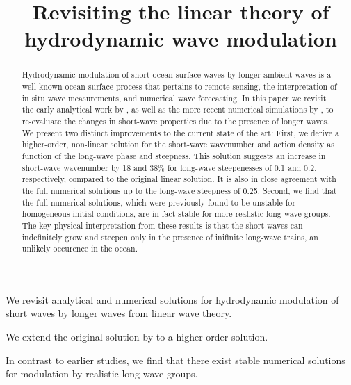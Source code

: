 \documentclass[draft]{agujournal2019}
\begin{document}
\title{Revisiting the linear theory of hydrodynamic wave modulation}




\begin{keypoints}
\item We revisit analytical and numerical solutions for hydrodynamic modulation of short waves by longer waves from linear wave theory.
\item We extend the original solution by  to a higher-order solution.
\item In contrast to earlier studies, we find that there exist stable numerical solutions for modulation by realistic long-wave groups.
\end{keypoints}

\begin{abstract}
Hydrodynamic modulation of short ocean surface waves by longer ambient waves is
a well-known ocean surface process that pertains to remote sensing, the
interpretation of in situ wave measurements, and numerical wave forecasting.
In this paper we revisit the early analytical work by ,
as well as the more recent numerical simulations by ,
to re-evaluate the changes in short-wave properties due to the presence of longer waves.
We present two distinct improvements to the current state of the art:
First, we derive a higher-order, non-linear solution for the short-wave wavenumber
and action density as function of the long-wave phase and steepness.
This solution suggests an increase in short-wave wavenumber by 18 and 38\% for
long-wave steepenesses of 0.1 and 0.2, respectively, compared to the original
linear solution.
It is also in close agreement with the full numerical solutions up to the
long-wave steepness of 0.25.
Second, we find that the full numerical solutions, which were previously found
to be unstable for homogeneous initial conditions, are in fact stable for more
realistic long-wave groups.
The key physical interpretation from these results is that the short waves can
indefinitely grow and steepen only in the presence of inifinite long-wave trains,
an unlikely occurence in the ocean.
\end{abstract}
\end{document}
